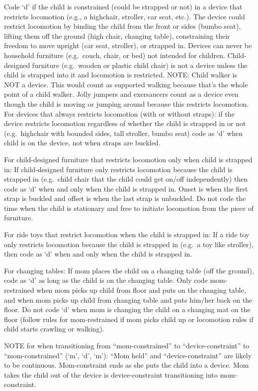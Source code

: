 \documentclass[
  12pt,
]{book}
\begin{document}
Code `d' if the child is constrained (could be strapped or not) in a device that restricts locomotion (e.g., a highchair, stroller, car seat, etc.). The device could restrict locomotion by binding the child from the front or sides (bumbo seat), lifting them off the ground (high chair, changing table), constraining their freedom to move upright (car seat, stroller), or strapped in. Devices can never be household furniture (e.g.~couch, chair, or bed) not intended for children. Child-designed furniture (e.g.~wooden or plastic child chair) is not a device unless the child is strapped into it and locomotion is restricted.
NOTE: Child walker is NOT a device. This would count as supported walking because that's the whole point of a child walker. Jolly jumpers and exersaucers count as a device even though the child is moving or jumping around because this restricts locomotion.
For devices that always restricts locomotion (with or without straps): if the device restricts locomotion regardless of whether the child is strapped in or not (e.g.~highchair with bounded sides, tall stroller, bumbo seat) code as `d' when child is on the device, not when straps are buckled.

For child-designed furniture that restricts locomotion only when child is strapped in: If child-designed furniture only restricts locomotion because the child is strapped in (e.g.~child chair that the child could get on/off independently) then code as `d' when and only when the child is strapped in. Onset is when the first strap is buckled and offset is when the last strap is unbuckled. Do not code the time when the child is stationary and free to initiate locomotion from the piece of furniture.

For ride toys that restrict locomotion when the child is strapped in: If a ride toy only restricts locomotion because the child is strapped in (e.g.~a toy like stroller), then code as `d' when and only when the child is strapped in.

For changing tables: If mom places the child on a changing table (off the ground), code as `d' as long as the child is on the changing table. Only code mom-restrained when mom picks up child from floor and puts on the changing table, and when mom picks up child from changing table and puts him/her back on the floor. Do not code `d' when mom is changing the child on a changing mat on the floor (follow rules for mom-restrained if mom picks child up or locomotion rules if child starts crawling or walking).

NOTE for when transitioning from ``mom-constrained'' to ``device-constraint'' to ``mom-constrained'' (`m', `d', `m'): ``Mom held'' and ``device-constraint'' are likely to be continuous. Mom-constraint ends as she puts the child into a device. Mom takes the child out of the device is device-constraint transitioning into mom-constraint.
\end{document}
